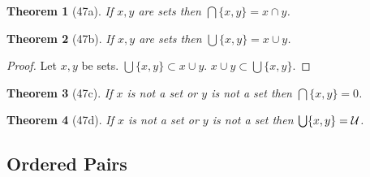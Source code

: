 \documentclass{scrartcl}
\newenvironment{forthel}{\begin{leftbar}}{\end{leftbar}}
\newtheorem*{theorem}{Theorem}
\newcommand{\pair}[2]{\{{#1},{#2}\}}
\begin{document}
\begin{forthel}
\begin{theorem}[47a] If $x,y$ are sets then $\bigcap \pair{x}{y} = x \cap y$.
\end{theorem}
\begin{theorem}[47b] If $x,y$ are sets then $\bigcup \pair{x}{y} = x \cup y$.
\end{theorem}
\begin{proof} Let $x,y$ be sets.
$\bigcup \pair{x}{y} \subset x \cup y$.
$x \cup y \subset \bigcup \pair{x}{y}$.
\end{proof}
\begin{theorem}[47c] If $x$ is not a set or $y$ is not a set then
$\bigcap \pair{x}{y} = 0$.
\end{theorem}
\begin{theorem}[47d] If $x$ is not a set or $y$ is not a set then
$\bigcup \pair{x}{y} = {\cal U}$.
\end{theorem}

\end{forthel}

\subsection{Ordered Pairs}
\end{document}
